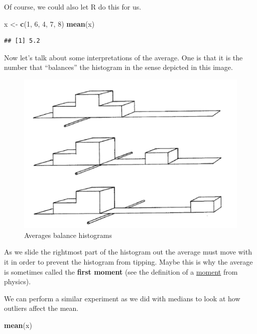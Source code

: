 \documentclass[]{book}
\newenvironment{Shaded}{\begin{snugshade}}{\end{snugshade}}
\newcommand{\DecValTok}[1]{\textcolor[rgb]{0.00,0.00,0.81}{#1}}
\newcommand{\KeywordTok}[1]{\textcolor[rgb]{0.13,0.29,0.53}{\textbf{#1}}}
\newcommand{\NormalTok}[1]{#1}
\newcommand{\StringTok}[1]{\textcolor[rgb]{0.31,0.60,0.02}{#1}}
\begin{document}
Of course, we could also let R do this for us.

\begin{Shaded}
\begin{Highlighting}[]
\NormalTok{x <-}\StringTok{ }\KeywordTok{c}\NormalTok{(}\DecValTok{1}\NormalTok{, }\DecValTok{6}\NormalTok{, }\DecValTok{4}\NormalTok{, }\DecValTok{7}\NormalTok{, }\DecValTok{8}\NormalTok{)}
\KeywordTok{mean}\NormalTok{(x)}
\end{Highlighting}
\end{Shaded}

\begin{verbatim}
## [1] 5.2
\end{verbatim}

Now let's talk about some interpretations of the average. One is that it is the number that ``balances'' the histogram in the sense depicted in this image.

\begin{figure}
\centering
\includegraphics{average_balance.png}
\caption{Averages balance histograms}
\end{figure}

As we slide the rightmost part of the histogram out the average must move with it in order to prevent the histogram from tipping. Maybe this is why the average is sometimes called the \textbf{first moment} (see the definition of a \href{https://simple.wikipedia.org/wiki/Moment_(physics)}{moment} from physics).

We can perform a similar experiment as we did with medians to look at how outliers affect the mean.

\begin{Shaded}
\begin{Highlighting}[]
\KeywordTok{mean}\NormalTok{(x)}
\end{Highlighting}
\end{Shaded}
\end{document}
